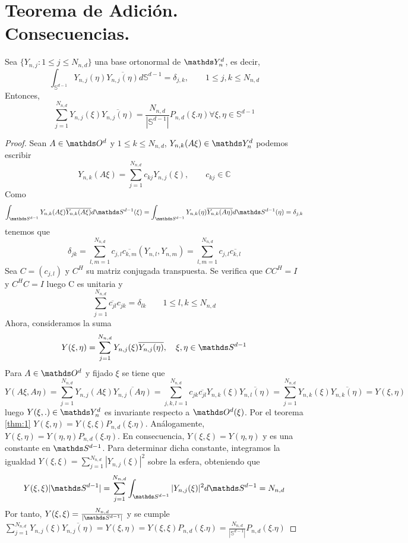 \section{Teorema de Adición. Consecuencias.}
\begin{thm}
Sea $\{Y_{n,j}:1\le j \le N_{n,d}\}$ una base ortonormal de $\spharm$, es decir,
$$
\int_{\mathds{S}^{d-1}} Y_{n,j}(\eta)\overline{Y_{n,j}(\eta)} d\mathds{S}^{d-1} = \delta_{j,k},\qquad	1 \le j,k \le N_{n,d}
$$
Entonces, 
$$
\sum_{j=1}^{N_{n,d}}Y_{n,j}(\xi)\overline{Y_{n,j}(\eta)} = \frac{N_{n,d}}{|\mathds{S}^{d-1}|}P_{n,d}(\xi.\eta)		\forall \xi,\eta \in \mathds{S}^{d-1}
$$

\end{thm}
\begin{proof}Sean $A\in\orto$ y $1\le k \le N_{n,d}$, $Y_{n,k}(A\xi)\in \spharm$ podemos escribir
$$
Y_{n,k}(A\xi) = \sum_{j=1}^{N_{n,d}} c_{kj}Y_{n,j}(\xi), \qquad  c_{kj}\in\mathds{C}
$$
Como $$
\int_{\sphere} Y_{n,k}(A\xi) \overline{Y_{n,k}(A\xi) } d\sphere(\xi) = \int_{\sphere} Y_{n,k}(\eta) \overline{Y_{n,k}(A\eta) } d\sphere(\eta) =\delta_{j,k}
$$
tenemos que 
$$
\delta_{jk} = \sum_{l,m = 1}^{N_{n,d}} c_{j,l}\overline{c_{k,m}}(Y_{n,l},Y_{n,m}) = \sum_{l,m = 1}^{N_{n,d}} c_{j,l}\overline{c_{k,l}}
$$
Sea $C=(c_{j,l})$ y $C^H$ su matriz conjugada transpuesta. Se verifica que $CC^H=I$ y $C^HC=I$ luego C es unitaria y
$$
\sum_{j=1}^{N_{n,d}} \overline{c_{jl}}c_{jk} = \delta_{lk} \qquad 1\le l,k \le N_{n,d}
$$
Ahora, consideramos la suma
$$
Y(\xi,\eta) = \sum_{j=1}^{N_{n,d}} Y_{n,j}(\xi)\overline{ Y_{n,j}(\eta)} ,\quad \xi,\eta\in\sphere
$$
Para $A\in\orto$ y fijado $\xi$ se tiene que
$$
Y(A\xi,A\eta) = \sum_{j=1}^{N_{n,d}} Y_{n,j}(A\xi)\overline{ Y_{n,j}(A\eta)} = \sum_{j,k,l=1}^{N_{n,d}} c_{jk}\overline{c_{jl}} Y_{n,k}(\xi)\overline{ Y_{n,l}(\eta)} = \sum_{j=1}^{N_{n,d}} Y_{n,k}(\xi)\overline{ Y_{n,k}(\eta)} = Y(\xi,\eta)
$$
luego $Y(\xi,.)\in\spharm$ es invariante respecto a $\orto(\xi)$. Por el teorema \ref{thm:1} $Y(\xi,\eta)=Y(\xi,\xi)P_{n,d}(\xi.\eta)$. Análogamente, $Y(\xi,\eta)=Y(\eta,\eta)P_{n,d}(\xi.\eta)$. En consecuencia, $Y(\xi,\xi) = Y(\eta,\eta)$ y es una constante en $\sphere$. Para determinar dicha constante, integramos la igualdad  $Y(\xi,\xi) =  \sum_{j=1}^{N_{n,d}} |Y_{n,j}(\xi)|^2 $ sobre la esfera, obteniendo que
$$
Y(\xi,\xi)|\sphere| =  \sum_{j=1}^{N_{n,d}}\int_{\sphere} |Y_{n,j}(\xi)|^2 d\sphere = N_{n,d}
$$
Por tanto, $Y(\xi,\xi)=\frac{N_{n,d}}{|\sphere|}$ y se cumple $\sum_{j=1}^{N_{n,d}}Y_{n,j}(\xi)\overline{Y_{n,j}(\eta)}= Y(\xi,\eta)=Y(\xi,\xi)P_{n,d}(\xi.\eta) = \frac{N_{n,d}}{|\mathds{S}^{d-1}|}P_{n,d}(\xi.\eta)	$
\end{proof}

